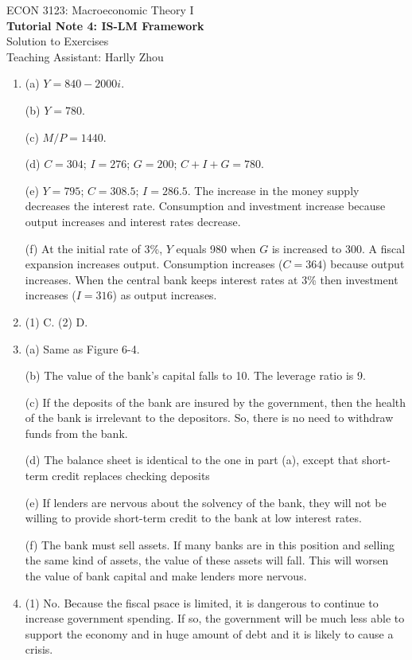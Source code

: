 \documentclass[12pt]{article}
\begin{document}
\begin{center}
    ECON 3123: Macroeconomic Theory I\\
    {\large \textbf{Tutorial Note 4: IS-LM Framework}}\\
    Solution to Exercises\\
    Teaching Assistant: Harlly Zhou
\end{center}

\begin{enumerate}[label=\arabic*.]
    \item (a) $Y = 840 - 2000 i$.
    
    (b) $Y = 780$.

    (c) $M/P = 1440$.

    (d) $C=304$; $I=276$; $G=200$; $C+I+G=780$.

    (e) $Y = 795$; $C =308.5$; $I = 286.5$. The increase in the money supply decreases the interest rate. Consumption and investment increase because output increases and interest rates decrease.

    (f) At the initial rate of 3\%, $Y$ equals 980 when $G$ is increased to 300. A fiscal expansion increases output. Consumption increases ($C = 364$) because output increases. When the central bank keeps interest rates at 3\% then investment increases ($I = 316$) as output increases.
    \item {\color{red}(1) C.} (2) D.
    \item (a) Same as Figure 6-4.
    
    (b) The value of the bank's capital falls to 10. The leverage ratio is 9.
    
    (c) If the deposits of the bank are insured by the government, then the health of the bank is irrelevant to the depositors. So, there is no need to withdraw funds from the bank.
    
    (d) The balance sheet is identical to the one in part (a), except that short-term credit replaces checking deposits
    
    (e) If lenders are nervous about the solvency of the bank, they will not be willing to provide short-term credit to the bank at low interest rates.
    
    (f) The bank must sell assets. If many banks are in this position and selling the same kind of assets, the value of these assets will fall. This will worsen the value of bank capital and make lenders more nervous.
    \item (1) No. Because the fiscal psace is limited, it is dangerous to continue to increase government spending. If so, the government will be much less able to support the economy and
    in huge amount of debt and it is likely to cause a crisis.
    

\end{enumerate}
\end{document}
